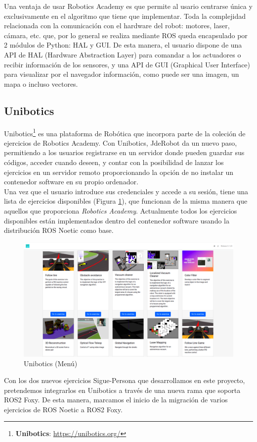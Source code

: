 Una ventaja de usar Robotics Academy es que permite al usario centrarse única y exclusivamente en el algoritmo que tiene que implementar. Toda la complejidad relacionada con la comunicación con el hardware del robot: motores, laser, cámara, etc. que, por lo general se realiza mediante ROS queda encapsulado por 2 módulos de Python: HAL y GUI. De esta manera, el usuario dispone de una API de HAL (Hardware Abstraction Layer) para comandar a los actuadores o recibir información de los sensores, y una API de GUI (Graphical User Interface) para visualizar por el navegador información, como puede ser una imagen, un mapa o incluso vectores.\\

\subsection{Unibotics}
\label{subsec:unibotics}

Unibotics\footnote{\textbf{Unibotics}: \url{https://unibotics.org/}} es una plataforma de Robótica que incorpora parte de la coleción de ejercicios de Robotics Academy. Con Unibotics, JdeRobot da un nuevo paso, permitiendo a los usuarios registrarse en un servidor donde pueden guardar sus códigos, acceder cuando deseen, y contar con la posibilidad de lanzar los ejercicios en un servidor remoto proporcionando la opción de no instalar un contenedor software en su propio ordenador.\\

Una vez que el usuario introduce sus credenciales y accede a su sesión, tiene una lista de ejercicios disponibles (Figura \ref{fig:menu-unibotics}), que funcionan de la misma manera que aquellos que proporciona \textit{Robotics Academy}. Actualmente todos los ejercicios disponibles están implementados dentro del contenedor software usando la distribución ROS Noetic como base.\\

\begin{figure} [H]
  \begin{center}
    \includegraphics[width=12cm]{imagenes/cap1/unibotics-menu.png}
  \end{center}
  \caption[Unibotics (Menú)]{Unibotics (Menú)}
  \label{fig:menu-unibotics}
\end{figure}

Con los dos nuevos ejercicios Sigue-Persona que desarrollamos en este proyecto, pretendemos integrarlos en Unibotics a través de una nueva rama que soporta ROS2 Foxy. De esta manera, marcamos el inicio de la migración de varios ejercicios de ROS Noetic a ROS2 Foxy.\\




